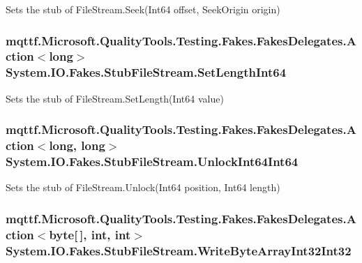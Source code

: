 Sets the stub of File\-Stream.\-Seek(\-Int64 offset, Seek\-Origin origin)

\hypertarget{class_system_1_1_i_o_1_1_fakes_1_1_stub_file_stream_ab5aedf531bb00b3dbda2b7197b64d04a}{
\subsubsection[{Set\-Length\-Int64}]{\setlength{\rightskip}{0pt plus 5cm}mqttf.\-Microsoft.\-Quality\-Tools.\-Testing.\-Fakes.\-Fakes\-Delegates.\-Action$<$long$>$ System.\-I\-O.\-Fakes.\-Stub\-File\-Stream.\-Set\-Length\-Int64}}\label{class_system_1_1_i_o_1_1_fakes_1_1_stub_file_stream_ab5aedf531bb00b3dbda2b7197b64d04a}


Sets the stub of File\-Stream.\-Set\-Length(\-Int64 value)

\hypertarget{class_system_1_1_i_o_1_1_fakes_1_1_stub_file_stream_a717ff9b007ba605adcfae5e93e8df4d8}{
\subsubsection[{Unlock\-Int64\-Int64}]{\setlength{\rightskip}{0pt plus 5cm}mqttf.\-Microsoft.\-Quality\-Tools.\-Testing.\-Fakes.\-Fakes\-Delegates.\-Action$<$long, long$>$ System.\-I\-O.\-Fakes.\-Stub\-File\-Stream.\-Unlock\-Int64\-Int64}}\label{class_system_1_1_i_o_1_1_fakes_1_1_stub_file_stream_a717ff9b007ba605adcfae5e93e8df4d8}


Sets the stub of File\-Stream.\-Unlock(\-Int64 position, Int64 length)

\hypertarget{class_system_1_1_i_o_1_1_fakes_1_1_stub_file_stream_afa03f780bed510464728e30cb165315d}{
\subsubsection[{Write\-Byte\-Array\-Int32\-Int32}]{\setlength{\rightskip}{0pt plus 5cm}mqttf.\-Microsoft.\-Quality\-Tools.\-Testing.\-Fakes.\-Fakes\-Delegates.\-Action$<$byte\mbox{[}$\,$\mbox{]}, int, int$>$ System.\-I\-O.\-Fakes.\-Stub\-File\-Stream.\-Write\-Byte\-Array\-Int32\-Int32}}\label{class_system_1_1_i_o_1_1_fakes_1_1_stub_file_stream_afa03f780bed510464728e30cb165315d}


